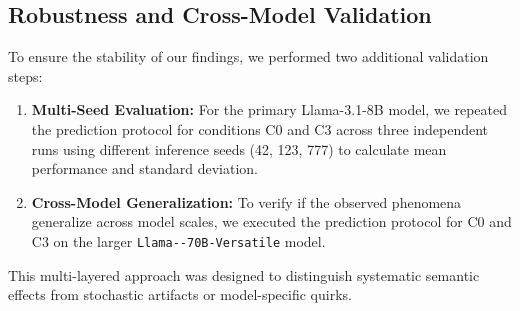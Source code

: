 \subsection{Robustness and Cross-Model Validation}
\label{sec:implementation_robustness}
To ensure the stability of our findings, we performed two additional validation steps:
\begin{enumerate}
    \item \textbf{Multi-Seed Evaluation:} For the primary Llama-3.1-8B model, we repeated the prediction protocol for conditions C0 and C3 across three independent runs using different inference seeds (42, 123, 777) to calculate mean performance and standard deviation.
    \item \textbf{Cross-Model Generalization:} To verify if the observed phenomena generalize across model scales, we executed the prediction protocol for C0 and C3 on the larger \texttt{Llama--\allowbreak 70B-\allowbreak Versatile} model.
\end{enumerate}
This multi-layered approach was designed to distinguish systematic semantic effects from stochastic artifacts or model-specific quirks.
